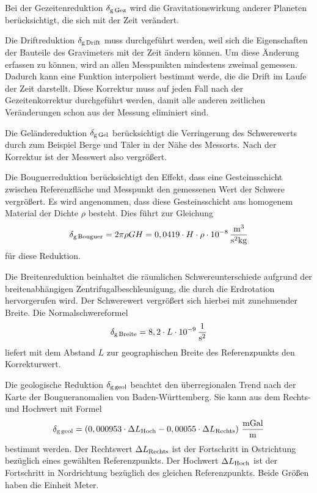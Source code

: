 Bei der Gezeitenreduktion $\delta_{\mathrm{g\,Gez}}$ wird die Gravitationswirkung anderer Planeten berücksichtigt, die sich mit der Zeit verändert.

Die Driftreduktion $\delta_{\mathrm{g\,Drift}}$ muss durchgeführt werden, weil sich die Eigenschaften der Bauteile des Gravimeters mit der Zeit ändern können. Um diese Änderung erfassen zu können, wird an allen Messpunkten mindestens zweimal gemessen. Dadurch kann eine Funktion interpoliert bestimmt werde, die die Drift im Laufe der Zeit darstellt. Diese Korrektur muss auf jeden Fall nach der Gezeitenkorrektur durchgeführt werden, damit alle anderen zeitlichen Veränderungen schon aus der Messung eliminiert sind.

Die Geländereduktion $\delta_{\mathrm{g\,Gel}}$ berücksichtigt die Verringerung des Schwerewerts durch zum Beispiel Berge und Täler in der Nähe des Messorts. Nach der Korrektur ist der Messwert also vergrößert.

Die Bouguerreduktion berücksichtigt den Effekt, dass eine Gesteinsschicht zwischen Referenzfläche und Messpunkt den gemessenen Wert der Schwere vergrößert. Es wird angenommen, dass diese Gesteinsschicht aus homogenem Material der Dichte $\rho$ besteht. Dies führt zur Gleichung
\begin{equation}
 \delta_{\mathrm{g\,Bouguer}}=2\pi\rho GH=0,0419\cdot H\cdot\rho\cdot 10^{-8}\,\frac{\mathrm{m^3}}{\mathrm{s^2kg}}
\end{equation}
für diese Reduktion.

Die Breitenreduktion beinhaltet die räumlichen Schwereunterschiede aufgrund der breitenabhängigen Zentrifugalbeschleunigung, die durch die Erdrotation hervorgerufen wird. Der Schwerewert vergrößert sich hierbei mit zunehmender Breite. Die Normalschwereformel
\begin{equation}
 \delta_{\mathrm{g\,Breite}}=8,2\cdot L\cdot 10^{-9}\,\frac{\mathrm{1}}{\mathrm{s^2}}
\end{equation}
liefert mit dem Abstand $L$ zur geographischen Breite des Referenzpunkts den Korrekturwert.

Die geologische Reduktion $\delta_{\mathrm{g\, geol}}$ beachtet den überregionalen Trend nach der Karte der Bougueranomalien von Baden-Württemberg. Sie kann aus dem Rechts- und Hochwert mit Formel
\begin{equation}
 \delta_{\mathrm{g\, geol}}=\left( 0,000953\cdot \Delta L_{\mathrm{Hoch}} - 0,00055 \cdot \Delta L_{\mathrm{Rechts}} \right) \,\frac{\mathrm{mGal}}{\mathrm{m}}
\end{equation}
bestimmt werden. Der Rechtswert $\Delta L_{\mathrm{Rechts}}$ ist der Fortschritt in Ostrichtung bezüglich eines gewählten Referenzpunkts.
Der Hochwert $\Delta L_{\mathrm{Hoch}}$ ist der Fortschritt in Nordrichtung bezüglich des gleichen Referenzpunkts. Beide Größen haben die Einheit Meter.

